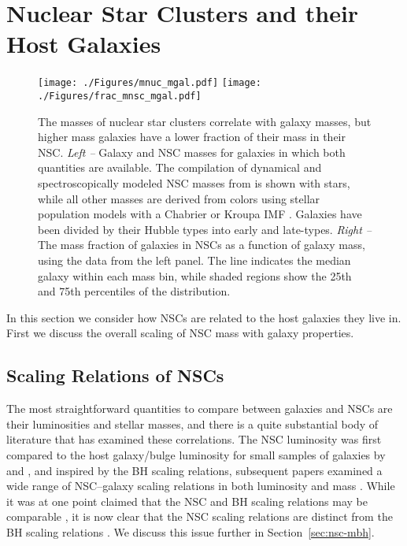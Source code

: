 \section{Nuclear Star Clusters and their Host Galaxies}\label{sec:hosts}

\begin{figure}
    \centering
    \texttt{[image: ./Figures/mnuc\_mgal.pdf]}
    \texttt{[image: ./Figures/frac\_mnsc\_mgal.pdf]}
    \caption{The masses of nuclear star clusters correlate with galaxy masses, but higher mass galaxies have a lower fraction of their mass in their NSC.  {\em Left --} Galaxy and NSC masses for galaxies in which both quantities are available.  The compilation of dynamical and spectroscopically modeled NSC masses from \citet{erwin12} is shown with stars, while all other masses are derived from colors using stellar population models with a Chabrier or Kroupa IMF \citep{georgiev16,spengler17,ordenes-briceno18,sanchez-janssen19}.  Galaxies have been divided by their Hubble types into early and late-types. {\em Right --}  The mass fraction of galaxies in NSCs as a function of galaxy mass, using the data from the left panel.  The line indicates the median galaxy within each mass bin, while shaded regions show the 25th and 75th percentiles of the distribution. }
    \label{fig:mass_scaling}
\end{figure}

In this section we consider how NSCs are related to the host galaxies they live in.  First we discuss the overall scaling of NSC mass with galaxy properties.



\subsection{Scaling Relations of NSCs}\label{subsec:scaling}

The most straightforward quantities to compare between galaxies and NSCs are their luminosities and stellar masses, and there is a quite substantial body of literature that has examined these correlations.  The NSC luminosity was first compared to the host galaxy/bulge luminosity for small samples of galaxies by \citet{balcells03} and \citet{graham03}, and inspired by the BH scaling relations, subsequent papers examined a wide range of NSC--galaxy scaling relations in both luminosity and mass \citep{ferrarese06,wehner06,rossa06,balcells07,seth08b,erwin12,scott13,denbrok14,sanchez-janssen19}.  While it was at one point claimed that the NSC and BH scaling relations may be comparable \citep{ferrarese06,wehner06}, it is now clear that the NSC scaling relations are distinct from the BH scaling relations \citep{erwin12,scott13}.  We discuss this issue further in Section~\ref{sec:nsc-mbh}.  


